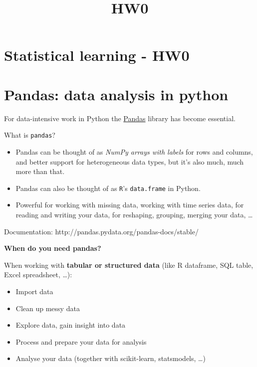 \documentclass[11pt]{article}
\title{HW0}
\providecommand{\tightlist}{%
      \setlength{\itemsep}{0pt}\setlength{\parskip}{0pt}}
\begin{document}
    
    
    \maketitle
    
    

    
    \hypertarget{statistical-learning---hw0}{%
\section{Statistical learning - HW0}\label{statistical-learning---hw0}}

    \hypertarget{pandas-data-analysis-in-python}{%
\section{Pandas: data analysis in
python}\label{pandas-data-analysis-in-python}}

For data-intensive work in Python the
\href{http://pandas.pydata.org}{Pandas} library has become essential.

What is \texttt{pandas}?

\begin{itemize}
\tightlist
\item
  Pandas can be thought of as \emph{NumPy arrays with labels} for rows
  and columns, and better support for heterogeneous data types, but it's
  also much, much more than that.
\item
  Pandas can also be thought of as \texttt{R}'s \texttt{data.frame} in
  Python.
\item
  Powerful for working with missing data, working with time series data,
  for reading and writing your data, for reshaping, grouping, merging
  your data, \ldots{}
\end{itemize}

Documentation: http://pandas.pydata.org/pandas-docs/stable/

\textbf{When do you need pandas?}

When working with \textbf{tabular or structured data} (like R dataframe,
SQL table, Excel spreadsheet, \ldots{}):

\begin{itemize}
\tightlist
\item
  Import data
\item
  Clean up messy data
\item
  Explore data, gain insight into data
\item
  Process and prepare your data for analysis
\item
  Analyse your data (together with scikit-learn, statsmodels, \ldots{})
\end{itemize}
\end{document}

